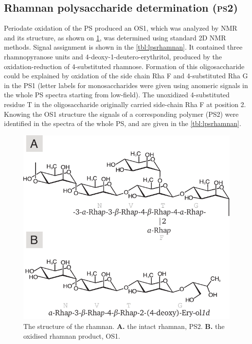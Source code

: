         \subsection{Rhamnan polysaccharide determination (\textsc{ps}2)} %
        \label{sub:rhamnan_polysaccharide_determination_ps2_}

        Periodate oxidation of the \ac{PS} produced an \ac{OS}1, which was analyzed by \ac{NMR} and its
        structure, as shown on \cref{fig:lpsrhamnan}, was determined using standard 2D \ac{NMR}
        methods. Signal assignment is shown in the \cref{tbl:lpsrhamnan}. It contained three
        rhamnopyranose units and 4-deoxy-1-deutero-erythritol, produced by the oxidation-reduction of
        4-substituted rhamnose. Formation of this oligosaccharide could be explained by oxidation of the
        side chain Rha F and 4-substituted Rha G in the \ac{PS}1 (letter labels for monosaccharides were
        given using anomeric signals in the whole \ac{PS} spectra starting from low-field). The unoxidized
        4-substituted residue T in the oligosaccharide originally carried side-chain Rha F at position
        2. Knowing the \ac{OS}1 structure the signals of a corresponding polymer (\ac{PS}2) were
        identified in the spectra of the whole \ac{PS}, and are given in the \cref{tbl:lpsrhamnan}.

        \begin{figure}[htb]
          \begin{center}
            \includegraphics[]{lps_chapter/img/lpsrhamnan.pdf}
          \end{center}
          \caption[The structure of the \caulobacter rhamnan.]{The structure of the \caulobacter rhamnan. \textbf{A.} the intact rhamnan, \ac{PS}2. \textbf{B.} the oxidised rhamnan product, \ac{OS}1.}
          \label{fig:lpsrhamnan}
        \end{figure}

